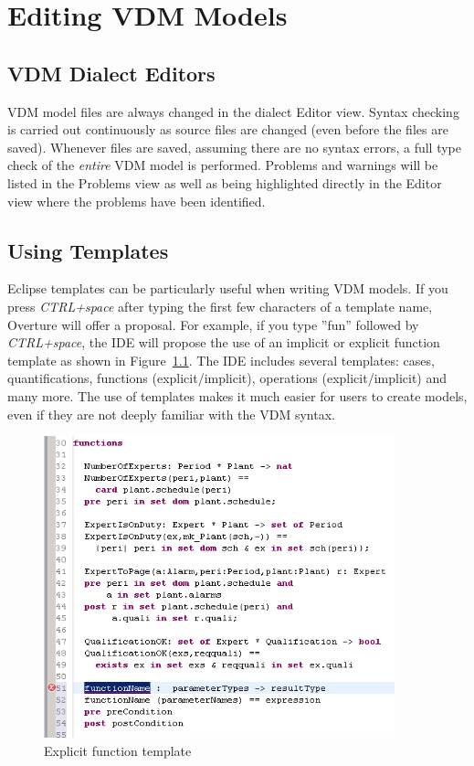 \documentclass{overturerepchap}
\begin{document}
\chapter{Editing VDM Models}\label{sec:editVDM}

\section{VDM Dialect Editors}

VDM model files are always changed in the dialect Editor view. Syntax checking
is carried out continuously as source files are
changed (even before the files are saved). Whenever files are saved, assuming
there are no syntax errors, a full type check of the \emph{entire} VDM model is
performed.
Problems and warnings will be listed in the Problems view as well as
being highlighted directly in the Editor view where the problems have been
identified.


\section{Using Templates}\label{sec:templates}

Eclipse templates can be particularly useful when writing VDM models. If you
press \textit{CTRL+space} after typing the first few characters of a template name,
Overture will offer a proposal. For example, if you type ''fun'' followed
by \textit{CTRL+space}, the IDE will propose the use of an implicit or explicit
function template as shown in Figure~\ref{fig:functionTemplate}. The IDE includes
several templates: cases, quantifications, functions (explicit/implicit),
operations (explicit/implicit) and many more. The use of templates makes it much
easier for users to create models, even if they are not deeply familiar
with the VDM syntax.

\begin{figure}
\begin{center}
\includegraphics[width=4in]{figures/FunctionTemplate}
\caption{Explicit function template}
\label{fig:functionTemplate}
\end{center}
\end{figure}
\end{document}
